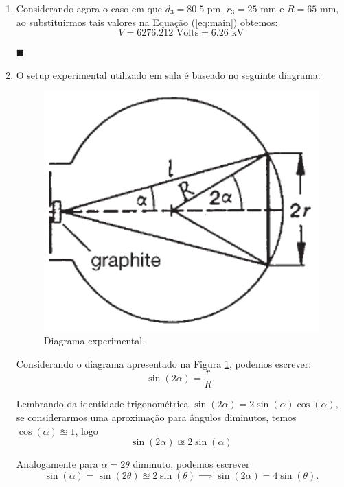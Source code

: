 \documentclass[12pt,a4paper]{article}
\begin{document}
\begin{enumerate}
        \item Considerando agora o caso em que $d_3=80.5\text{ pm}$, $r_3=25\text{ mm}$ e $R=65\text{ mm}$, ao substituirmos tais valores na Equação (\ref{eq:main}) obtemos:
        \begin{equation}
            \boxed{V=6276.212\text{ Volts}=6.26\text{ kV}}
        \end{equation}
        \begin{flushright}
            $\blacksquare$
        \end{flushright}


        \item O setup experimental utilizado em sala é baseado no seguinte diagrama:
        \begin{figure}[htb!]
            \centering
            \includegraphics[width=0.5\linewidth]{Figures/Diagram.png}
            \caption{Diagrama experimental.}
            \label{fig:Diagram}
        \end{figure}

        Considerando o diagrama apresentado na Figura \ref{fig:Diagram}, podemos escrever:
        \begin{equation} \label{eq:sin(2alpha)}
            \sin{(2\alpha)}=\frac{r}{R},
        \end{equation}

        Lembrando da identidade trigonométrica $\sin{(2\alpha)}=2\sin{(\alpha)}\cos{(\alpha)}$, se considerarmos uma aproximação para ângulos diminutos, temos $\cos{(\alpha)}\approxeq1$, logo
        \begin{equation}
            \sin{(2\alpha)\approxeq2\sin{(\alpha)}}
        \end{equation}

        Analogamente para $\alpha=2\theta$ diminuto, podemos escrever
        \begin{equation}
            \sin{(\alpha)}=\sin{(2\theta)}\approxeq2\sin{(\theta)}\implies\sin{(2\alpha)}=4\sin{(\theta)}.
        \end{equation}


\end{enumerate}
\end{document}
